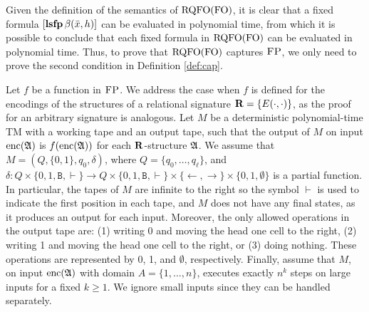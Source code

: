 
\newcommand{\ttB}{\mathtt{B}}
\newcommand{\successor}{\text{succ}}
\newcommand{\out}{\text{\it out}}

Given the definition of the semantics of ${\rm RQFO}({\rm FO})$, it is clear that a fixed formula $[{\bf lsfp} \, \beta(\bar{x}, h)]$ can be evaluated in polynomial time, from which it is possible to conclude that each fixed formula in ${\rm RQFO}({\rm FO})$ can be evaluated in polynomial time. Thus, to prove that ${\rm RQFO}({\rm FO})$ captures $\text{\sc FP}$, we only need to prove the second condition in Definition \ref{def:cap}.

Let $f$ be a function in $\text{\sc FP}$. We address the case when $f$ is defined for the encodings of the structures of a relational signature $\mathbf{R} = \{ E(\cdot, \cdot) \}$, as the proof for an arbitrary signature is analogous.
 Let $M$ be a deterministic polynomial-time TM with a working tape and an output tape, such that the output of $M$ on input ${\rm enc}(\mathfrak{A})$ is $f({\rm enc}(\mathfrak{A}))$ for each $\mathbf{R}$-structure $\mathfrak{A}$. We assume that $M = (Q,\{0,1\},q_0,\delta)$, 
 where $Q = \{q_0,\ldots,q_{\ell}\}$, and $\delta\colon Q\times\{0,1,\ttB, \vdash\}\to Q\times\{0,1,\ttB, \vdash\}\times \{\leftarrow,\rightarrow\}\times\{0,1,\emptyset\}$ is a partial function. In particular, the tapes of $M$ are infinite to the right so the symbol $\vdash$ is used to indicate the first position in each tape, and $M$ does not have any final states, as it produces an output for each input. Moreover, the only allowed operations in the output tape are: 
 (1) writing 0 and moving the head one cell to the right, (2) writing 1 and moving the head one cell to the right, or (3) doing nothing. These operations are represented by 0, 1, and $\emptyset$, respectively. Finally, assume that $M$, on input ${\rm enc}(\mathfrak{A})$ with domain $A = \{1,\dots,n\}$, executes exactly $n^k$ steps on large inputs for a fixed $k \geq 1$. We ignore small inputs since they can be handled separately.

